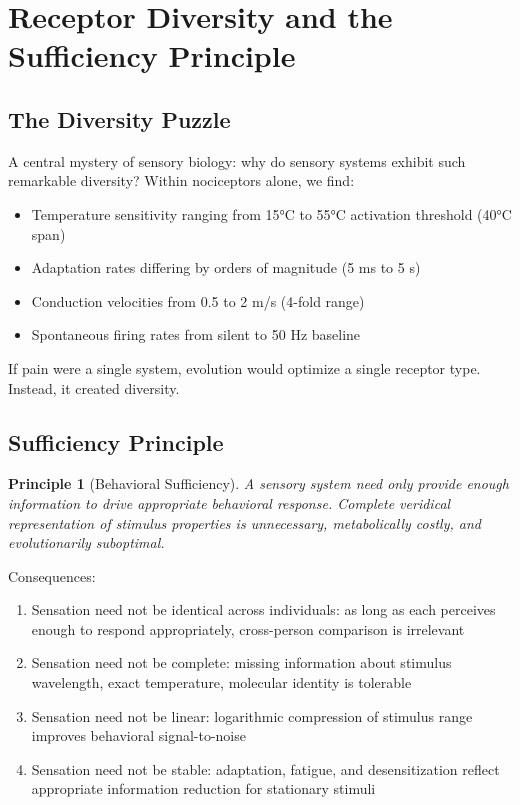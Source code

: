 \documentclass[twocolumn,10pt]{article}
\newtheorem{principle}[theorem]{Principle}
\theoremstyle{remark}
\begin{document}
\section{Receptor Diversity and the Sufficiency Principle}
\label{sec:sufficiency}

\subsection{The Diversity Puzzle}

A central mystery of sensory biology: why do sensory systems exhibit such remarkable diversity? Within nociceptors alone, we find:
\begin{itemize}
  \item Temperature sensitivity ranging from 15°C to 55°C activation threshold (40°C span)
  \item Adaptation rates differing by orders of magnitude (5 ms to 5 s)
  \item Conduction velocities from 0.5 to 2 m/s (4-fold range)
  \item Spontaneous firing rates from silent to 50 Hz baseline
\end{itemize}

If pain were a single system, evolution would optimize a single receptor type. Instead, it created diversity.

\subsection{Sufficiency Principle}

\begin{principle}[Behavioral Sufficiency]
\label{princ:sufficiency}
A sensory system need only provide enough information to drive appropriate behavioral response. Complete veridical representation of stimulus properties is unnecessary, metabolically costly, and evolutionarily suboptimal.
\end{principle}

Consequences:
\begin{enumerate}
  \item Sensation need not be identical across individuals: as long as each perceives enough to respond appropriately, cross-person comparison is irrelevant
  \item Sensation need not be complete: missing information about stimulus wavelength, exact temperature, molecular identity is tolerable
  \item Sensation need not be linear: logarithmic compression of stimulus range improves behavioral signal-to-noise
  \item Sensation need not be stable: adaptation, fatigue, and desensitization reflect appropriate information reduction for stationary stimuli
\end{enumerate}
\end{document}
